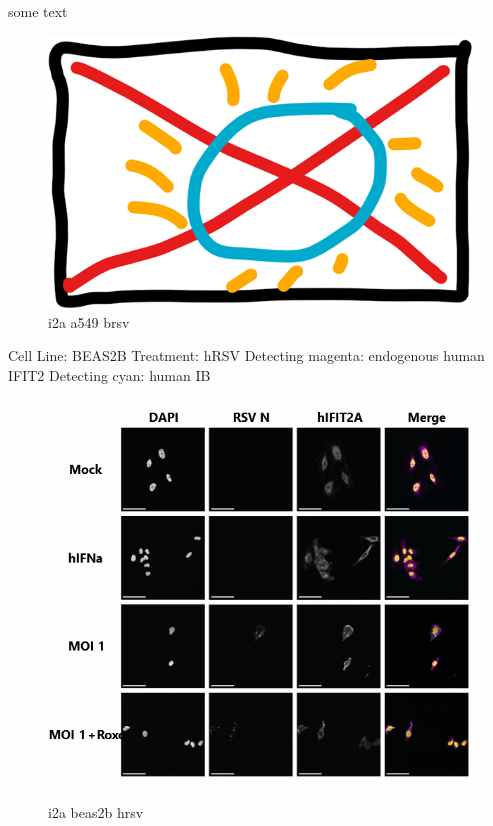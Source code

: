 some text

\begin{figure}
    \centering
    \includegraphics[width=0.5\linewidth]{09. Chapter 4//Figs//01. I2A/00. placeholder.png}
    \caption[i2a a549 brsv]{i2a a549 brsv}
    \label{i2a a549 brsv}
\end{figure}

Cell Line: BEAS2B \newline
Treatment: hRSV \newline
Detecting magenta: endogenous human IFIT2  \newline
Detecting cyan: human IB \newline

\begin{figure}
    \centering
    \includegraphics[width=1\linewidth]{09. Chapter 4//Figs//01. I2A/07. i2a beas2b hrsv.png}
    \caption[i2a beas2b hrsv]{i2a beas2b hrsv}
    \label{i2a beas2b hrsv}
\end{figure}

